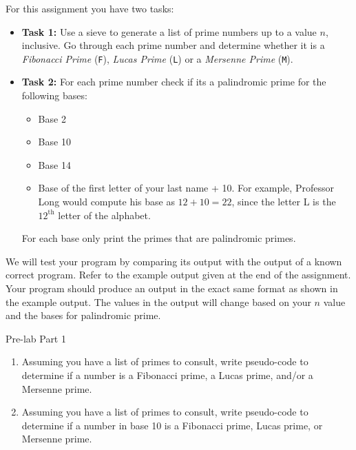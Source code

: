 \documentclass[11pt,twocolumn]{article}
\begin{document}
\noindent For this assignment you have two tasks:

\begin{itemize}

\item \textbf{Task 1:} Use a sieve to generate a list of prime numbers up to a
    value $n$, inclusive. Go through each prime number and determine whether it
    is a \emph{Fibonacci Prime} (\texttt{F}), \emph{Lucas Prime} (\texttt{L}) or
    a \emph{Mersenne Prime} (\texttt{M}).
\item \textbf{Task 2:} For each prime number check if its a palindromic prime
    for the following bases:
	\begin{itemize}
		\item Base 2
		\item Base 10
		\item Base 14
        \item Base of the first letter of your last name + 10. For example,
            Professor Long would compute his base as $12 + 10 = 22$, since the
            letter L is the $12^{\text{th}}$ letter of the alphabet.
	\end{itemize}
    For each base only print the primes that are palindromic primes.

\end{itemize}

We will test your program by comparing its output with the output of a known
correct program. Refer to the example output given at the end of the assignment.
Your program should produce an output in the exact same format as shown in the
example output. The values in the output will change based on your $n$ value and
the bases for palindromic prime.

\medskip
\begin{prelab}{Pre-lab Part 1}
	\begin{enumerate}
    \item Assuming you have a list of primes to consult, write pseudo-code to
        determine if a number is a Fibonacci prime, a Lucas prime, and/or a
        Mersenne prime.
	\item Assuming you have a list of primes to consult, write pseudo-code to determine if a
	       number in base 10 is a Fibonacci prime, Lucas prime, or Mersenne prime.
	\end{enumerate}
\end{prelab}

\end{document}
